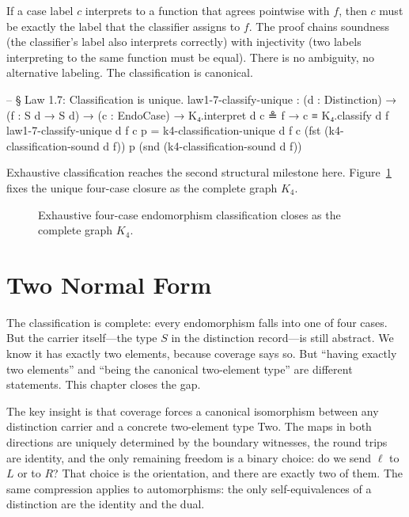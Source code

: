 \documentclass[11pt,a4paper]{book}
\def\texttt#1{#1}%
\begin{document}
If a case label $c$ interprets to a function that agrees pointwise with $f$, then $c$ must be exactly the label that the classifier assigns to $f$. The proof chains soundness (the classifier's label also interprets correctly) with injectivity (two labels interpreting to the same function must be equal). There is no ambiguity, no alternative labeling. The classification is canonical.

\begin{code}
-- § Law 1.7: Classification is unique.
law1-7-classify-unique :
  (d : Distinction) →
  (f : S d → S d) →
  (c : EndoCase) →
  K₄.interpret d c ≗ f →
  c ≡ K₄.classify d f
law1-7-classify-unique d f c p =
  k4-classification-unique d f c (fst (k4-classification-sound d f)) p (snd (k4-classification-sound d f))
\end{code}

Exhaustive classification reaches the second structural milestone here. Figure~\ref{fig:k4-classification} fixes the unique four-case closure as the complete graph $K_4$.

\begin{figure}[h]
\centering
{}
\caption{Exhaustive four-case endomorphism classification closes as the complete graph $K_4$.}
\label{fig:k4-classification}
\end{figure}

\chapter{Two Normal Form}

The classification is complete: every endomorphism falls into one of four cases. But the carrier itself—the type $S$ in the distinction record—is still abstract. We know it has exactly two elements, because coverage says so. But ``having exactly two elements'' and ``being the canonical two-element type'' are different statements. This chapter closes the gap.

The key insight is that coverage forces a canonical isomorphism between any distinction carrier and a concrete two-element type \texttt{Two}. The maps in both directions are uniquely determined by the boundary witnesses, the round trips are identity, and the only remaining freedom is a binary choice: do we send $\ell$ to $L$ or to $R$? That choice is the orientation, and there are exactly two of them. The same compression applies to automorphisms: the only self-equivalences of a distinction are the identity and the dual.
\end{document}
